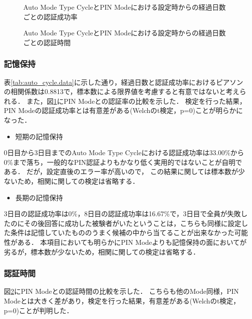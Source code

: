 \begin{figure}[ht]
  \begin{center}
  \end{center}
  \caption{Auto Mode Type CycleとPIN Modeにおける設定時からの経過日数ごとの認証成功率}
  \label{fig:ex_auto_cycle_vs_pin_rate}
\end{figure}

\begin{figure}[ht]
  \begin{center}
  \end{center}
  \caption{Auto Mode Type CycleとPIN Modeにおける設定時からの経過日数ごとの認証時間}
  \label{fig:ex_auto_cycle_vs_pin_time}
\end{figure}

\subsubsection{記憶保持}
表\ref{tab:auto_cycle.data}に示した通り，経過日数と認証成功率におけるピアソンの相関係数は0.8813で，標本数による限界値を考慮すると有意ではないと考えられる．
また，図\ref{fig:ex_auto_cycle_vs_pin_rate}にPIN Modeとの認証率の比較を示した．
検定を行った結果，PIN Modeの認証成功率とは有意差がある(Welchのt検定，p=0)ことが明らかになった．
\begin{itemize}
  \item 短期の記憶保持
\end{itemize}
0日目から3日目までのAuto Mode Type Cycleにおける認証成功率は33.00\%から0\%まで落ち，一般的なPIN認証よりもかなり低く実用的ではないことが自明である．
だが，設定直後のエラー率が高いので，
この結果に関しては標本数が少ないため，相関に関しての検定は省略する．

\begin{itemize}
  \item 長期の記憶保持
\end{itemize}
3日目の認証成功率は0\%，8日目の認証成功率は16.67\%で，3日目で全員が失敗したのにその後回答に成功した被験者がいたということは，こちらも同様に設定した条件は記憶していたもののうまく候補の中から当てることが出来なかった可能性がある．
本項目においても明らかにPIN Modeよりも記憶保持の面においてが劣るが，標本数が少ないため，相関に関しての検定は省略する．

\subsubsection{認証時間}
図\ref{fig:ex_auto_cycle_vs_pin_time}にPIN Modeとの認証時間の比較を示した．
こちらも他のMode同様，PIN Modeとは大きく差があり，検定を行った結果，有意差がある(Welchのt検定，p=0)ことが判明した．

